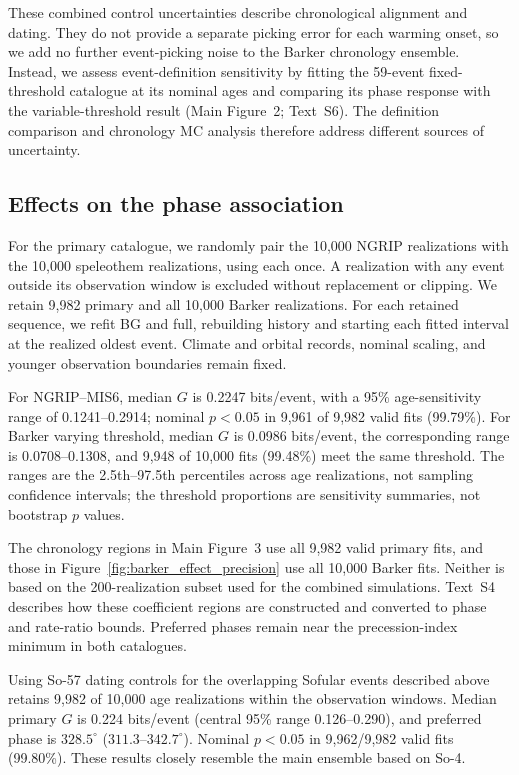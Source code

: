 \documentclass[11pt]{article}
\begin{document}
These combined control uncertainties describe chronological alignment and dating. They do not provide a separate picking error for each warming onset, so we add no further event-picking noise to the Barker chronology ensemble. Instead, we assess event-definition sensitivity by fitting the 59-event fixed-threshold catalogue at its nominal ages and comparing its phase response with the variable-threshold result (Main Figure~2; Text~S6). The definition comparison and chronology MC analysis therefore address different sources of uncertainty.

\subsection*{Effects on the phase association}

For the primary catalogue, we randomly pair the 10,000 NGRIP realizations with the 10,000 speleothem realizations, using each once. A realization with any event outside its observation window is excluded without replacement or clipping. We retain 9,982 primary and all 10,000 Barker realizations. For each retained sequence, we refit BG and full, rebuilding history and starting each fitted interval at the realized oldest event. Climate and orbital records, nominal scaling, and younger observation boundaries remain fixed.

For NGRIP--MIS6, median $G$ is 0.2247 bits/event, with a 95\% age-sensitivity range of 0.1241--0.2914; nominal $p<0.05$ in 9,961 of 9,982 valid fits (99.79\%). For Barker varying threshold, median $G$ is 0.0986 bits/event, the corresponding range is 0.0708--0.1308, and 9,948 of 10,000 fits (99.48\%) meet the same threshold. The ranges are the 2.5th--97.5th percentiles across age realizations, not sampling confidence intervals; the threshold proportions are sensitivity summaries, not bootstrap $p$ values.

The chronology regions in Main Figure~3 use all 9,982 valid primary fits, and those in Figure~\ref{fig:barker_effect_precision} use all 10,000 Barker fits. Neither is based on the 200-realization subset used for the combined simulations. Text~S4 describes how these coefficient regions are constructed and converted to phase and rate-ratio bounds. Preferred phases remain near the precession-index minimum in both catalogues.

Using So-57 dating controls for the overlapping Sofular events described above retains 9,982 of 10,000 age realizations within the observation windows. Median primary $G$ is 0.224 bits/event (central 95\% range 0.126--0.290), and preferred phase is $328.5^\circ$ ($311.3$--$342.7^\circ$). Nominal $p<0.05$ in 9,962/9,982 valid fits (99.80\%). These results closely resemble the main ensemble based on So-4.
\end{document}
